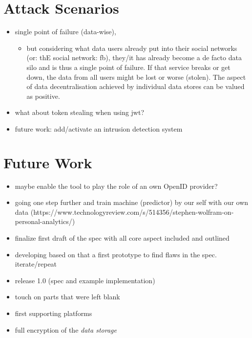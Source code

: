 \documentclass[12pt,english,a4paper,titlepage,cleardoublepage=empty,dottedtoc]{report}
\providecommand{\tightlist}{%
  \setlength{\itemsep}{0pt}\setlength{\parskip}{0pt}}
\begin{document}
\section{Attack Scenarios}\label{attack-scenarios}

\begin{itemize}
\item
  single point of failure (data-wise),

  \begin{itemize}
  \tightlist
  \item
    but considering what data users already put into their social
    networks (or: thE social network: fb), they/it has already become a
    de facto data silo and is thus a single point of failure. If that
    service breaks or get down, the data from all users might be lost or
    worse (stolen). The aspect of data decentralisation achieved by
    individual data stores can be valued as positive.
  \end{itemize}
\item
  what about token stealing when using jwt?
\item
  future work: add/activate an intrusion detection system
\end{itemize}

\section{Future Work}\label{future-work}

\begin{itemize}
\item
  maybe enable the tool to play the role of an own OpenID provider?
\item
  going one step further and train machine (predictor) by our self with
  our own data
  (https://www.technologyreview.com/s/514356/stephen-wolfram-on-personal-analytics/)
\item
  finalize first draft of the spec with all core aspect included and
  outlined
\item
  developing based on that a first prototype to find flaws in the spec.
  iterate/repeat
\item
  release 1.0 (spec and example implementation)
\item
  touch on parts that were left blank
\item
  first supporting platforms
\item
  full encryption of the \emph{data storage}
\end{itemize}
\end{document}
